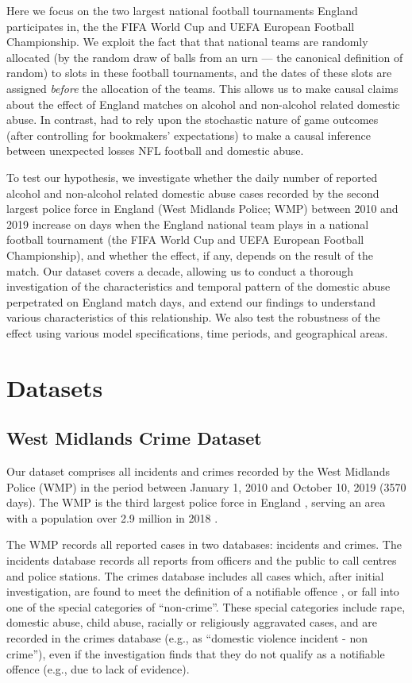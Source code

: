 \documentclass[12pt, a4paper]{article}
\begin{document}
Here we focus on the two largest national football tournaments England participates in, the the FIFA World Cup and UEFA European Football Championship. We exploit the fact that that national teams are randomly allocated (by the random draw of balls from an urn --- the canonical definition of random) to slots in these football tournaments, and the dates of these slots are assigned \emph{before} the allocation of the teams. This allows us to make causal claims about the effect of England matches on alcohol and non-alcohol related domestic abuse. In contrast,  had to rely upon the stochastic nature of game outcomes (after controlling for bookmakers' expectations) to make a causal inference between unexpected losses NFL football and domestic abuse.

To test our hypothesis, we investigate whether the daily number of reported alcohol and non-alcohol related domestic abuse cases recorded by the second largest police force in England (West Midlands Police; WMP) between 2010 and 2019 increase on days when the England national team plays in a national football tournament (the FIFA World Cup and UEFA European Football Championship), and whether the effect, if any, depends on the result of the match. Our dataset covers a decade, allowing us to conduct a thorough investigation of the characteristics and temporal pattern of the domestic abuse perpetrated on England match days, and extend our findings to understand various characteristics of this relationship. We also test the robustness of the effect using various model specifications, time periods, and geographical areas.



\section{Datasets}

\subsection{West Midlands Crime Dataset}


Our dataset comprises all incidents and crimes recorded by the West Midlands Police (WMP) in the period between January 1, 2010 and October 10, 2019 (3570 days). The WMP is the third largest police force in England \cite{Homeoffice}, serving an area with a population over 2.9 million in 2018 \cite{populationfigure}.

The WMP records all reported cases in two databases: incidents and crimes. The incidents database records all reports from officers and the public to call centres and police stations. The crimes database includes all cases which, after initial investigation, are found to meet the definition of a notifiable offence , or fall into one of the special categories of ``non-crime''. These special categories include rape, domestic abuse, child abuse, racially or religiously aggravated cases, and are recorded in the crimes database (e.g., as ``domestic violence incident - non crime''), even if the investigation finds that they do not qualify as a notifiable offence (e.g., due to lack of evidence).
\end{document}
